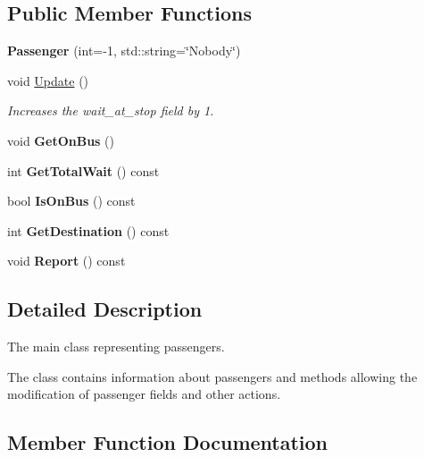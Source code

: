 \subsection*{Public Member Functions}
\begin{DoxyCompactItemize}
\item 
\mbox{\label{classPassenger_a5c3addb9a6fd03e5e5642ed844e2702c}} 
{\bfseries Passenger} (int=-\/1, std\+::string=\char`\"{}Nobody\char`\"{})
\item 
void \hyperlink{classPassenger_a960de3b29fc17a2c2d79c0b79d5cf299}{Update} ()
\begin{DoxyCompactList}\small\item\em Increases the wait\+\_\+at\+\_\+stop field by 1. \end{DoxyCompactList}\item 
\mbox{\label{classPassenger_ae2ba639cfef39781ac079778578bd9fe}} 
void {\bfseries Get\+On\+Bus} ()
\item 
\mbox{\label{classPassenger_a25158560f790ef7ef06d94c414b34f25}} 
int {\bfseries Get\+Total\+Wait} () const
\item 
\mbox{\label{classPassenger_a2acf008ec444afcc859b914ee24add0e}} 
bool {\bfseries Is\+On\+Bus} () const
\item 
\mbox{\label{classPassenger_a49db0ee527377aae6077df190a11501c}} 
int {\bfseries Get\+Destination} () const
\item 
\mbox{\label{classPassenger_ac54ce797e412a4895febe10f07dc5df5}} 
void {\bfseries Report} () const
\end{DoxyCompactItemize}


\subsection{Detailed Description}
The main class representing passengers. 

The class contains information about passengers and methods allowing the modification of passenger fields and other actions. 

\subsection{Member Function Documentation}
\mbox{\label{classPassenger_a960de3b29fc17a2c2d79c0b79d5cf299}} 
